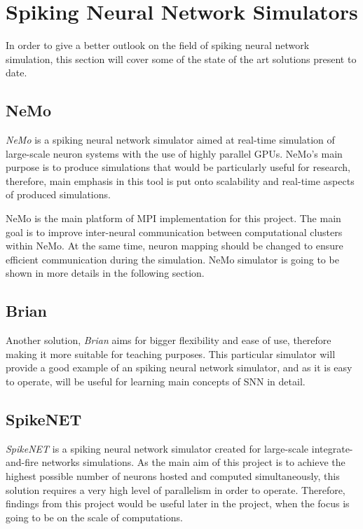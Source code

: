 \section{Spiking Neural Network Simulators}

In order to give a better outlook on the field of spiking neural network simulation, this section will cover some of the state of the art solutions present to date.

\subsection{NeMo}

\emph{NeMo} is a spiking neural network simulator aimed at real-time simulation of large-scale neuron systems with the use of highly parallel GPUs.\cite{AndreasK.Fidjeland2009}
NeMo's main purpose is to produce simulations that would be particularly useful for research, therefore, main emphasis in this tool is put onto scalability and real-time aspects
of produced simulations.

NeMo is the main platform of MPI implementation for this project. The main goal is to improve inter-neural communication between computational clusters within NeMo.
At the same time, neuron mapping should be changed to ensure efficient communication during the simulation. NeMo simulator is going to be shown in more details in the following section.

\subsection{Brian}

Another solution, \emph{Brian} aims for bigger flexibility and ease of use, therefore making it more suitable for teaching purposes. \cite{Goodman2008} This
particular simulator will provide a good example of an spiking neural network simulator, and as it is easy to operate, will be useful for learning main concepts
of SNN in detail.

\subsection{SpikeNET}

\emph{SpikeNET} is a spiking neural network simulator created for large-scale integrate-and-fire networks simulations.\cite{ArnaudDelorme1999} As the main aim of this project is to
achieve the highest possible number of neurons hosted and computed simultaneously, this solution requires a very high level of parallelism in order to operate.
Therefore, findings from this project would be useful later in the project, when the focus is going to be on the scale of computations.

